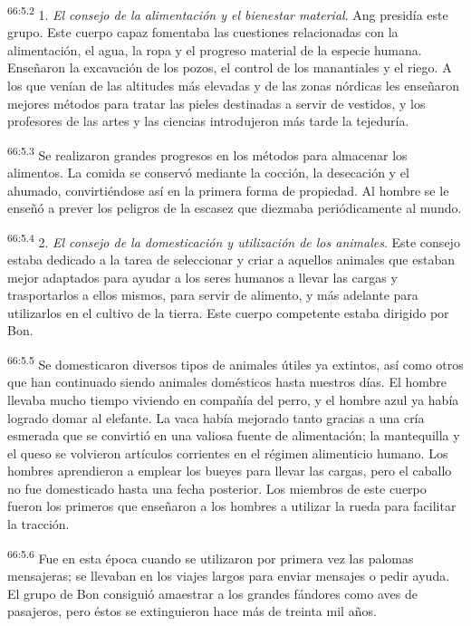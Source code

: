 \par
\textsuperscript{66:5.2} 1. \textit{El consejo de la alimentación y el bienestar material}. Ang presidía este grupo. Este cuerpo capaz fomentaba las cuestiones relacionadas con la alimentación, el agua, la ropa y el progreso material de la especie humana. Enseñaron la excavación de los pozos, el control de los manantiales y el riego. A los que venían de las altitudes más elevadas y de las zonas nórdicas les enseñaron mejores métodos para tratar las pieles destinadas a servir de vestidos, y los profesores de las artes y las ciencias introdujeron más tarde la tejeduría.

\par
\textsuperscript{66:5.3} Se realizaron grandes progresos en los métodos para almacenar los alimentos. La comida se conservó mediante la cocción, la desecación y el ahumado, convirtiéndose así en la primera forma de propiedad. Al hombre se le enseñó a prever los peligros de la escasez que diezmaba periódicamente al mundo.

\par
\textsuperscript{66:5.4} 2. \textit{El consejo de la domesticación y utilización de los animales}. Este consejo estaba dedicado a la tarea de seleccionar y criar a aquellos animales que estaban mejor adaptados para ayudar a los seres humanos a llevar las cargas y trasportarlos a ellos mismos, para servir de alimento, y más adelante para utilizarlos en el cultivo de la tierra. Este cuerpo competente estaba dirigido por Bon.

\par
\textsuperscript{66:5.5} Se domesticaron diversos tipos de animales útiles ya extintos, así como otros que han continuado siendo animales domésticos hasta nuestros días. El hombre llevaba mucho tiempo viviendo en compañía del perro, y el hombre azul ya había logrado domar al elefante. La vaca había mejorado tanto gracias a una cría esmerada que se convirtió en una valiosa fuente de alimentación; la mantequilla y el queso se volvieron artículos corrientes en el régimen alimenticio humano. Los hombres aprendieron a emplear los bueyes para llevar las cargas, pero el caballo no fue domesticado hasta una fecha posterior. Los miembros de este cuerpo fueron los primeros que enseñaron a los hombres a utilizar la rueda para facilitar la tracción.

\par
\textsuperscript{66:5.6} Fue en esta época cuando se utilizaron por primera vez las palomas mensajeras; se llevaban en los viajes largos para enviar mensajes o pedir ayuda. El grupo de Bon consiguió amaestrar a los grandes fándores como aves de pasajeros, pero éstos se extinguieron hace más de treinta mil años.

